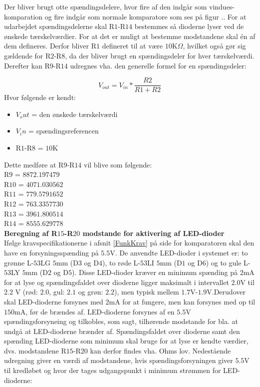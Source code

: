 Der bliver brugt otte spændingsdelere, hvor fire af den indgår som vindues-komparation og fire indgår som normale komparatore som ses på figur .. 
For at udarbejdet spændingsdelerne skal R$1$-R$14$ bestemmes så dioderne lyser ved de ønskede tærskelværdier. For at det er muligt at bestemme modstandene skal én af dem defineres.  Derfor bliver R$1$ defineret til at være $10$K$\Omega$, hvilket også gør sig gældende for R$2$-R$8$, da der bliver brugt en spændingsdeler for hver tærskelværdi. Derefter kan R$9$-R$14$ udregnes vha. den generelle formel for en spændingsdeler:

\begin{equation}
V_{out}=V_{in}*\dfrac{R2}{R1+R2}
\end{equation}
Hvor følgende er kendt:
\begin{itemize}
\item $V_out$ = den ønskede tærskelværdi
\item $V_in$ = spændingsreferencen
\item R$1$-R$8$ = $10$K
\end{itemize}

Dette medføre at R$9$-R$14$ vil blive som følgende:\\
R$9$ = $8872.197479$\\
R$10$ = $4071.030562$ \\
R$11$ = $779.5791652$ \\
R$12$ = $763.3357730$ \\
R$13$ = $3961.800514$ \\
R$14$ = $8555.629778$ \\


\noindent\textbf{Beregning af R$15$-R$20$ modstande for aktivering af LED-dioder} \\
Ifølge kravspecifikationerne i afsnit \ref{FunkKrav}  på side \pageref{FunkKrav} for komparatoren skal den have en forsyningsspænding på  $5.5$V. De anvendte LED-dioder i systemet er: to grønne L-$53$LG $5$mm (D$3$  og D$4$), to røde L-$53$LI $5$mm (D$1$ og D$6$) og to gule L-$53$LY $5$mm (D$2$ og D$5$). Disse LED-dioder kræver en minimum spænding på 2mA for at lyse og spændingsfaldet over dioderne ligger maksimalt i intervallet $2.0$V til $2.2$ V (rød: $2.0$, gul: $2.1$ og grøn: $2.2$), men typisk mellem $1.7$V-$1.9$V.Derudover skal LED-dioderne forsynes med $2$mA for at fungere, men kan forsynes med op til $150$mA, før de brændes af. LED-dioderne forsynes af en $5.5$V spændingsforsyneing og tilkobles, som sagt, tilhørende modstande for bla. at undgå at LED-dioderne brænder af. Spændingsfaldet over dioderne samt den spænding LED-dioderne som minimum skal bruge for at lyse er kendte værdier, dvs. modstandene R$15$-R$20$ kan derfor findes vha. Ohms lov. Nedestående udregning giver en værdi af modstandene, hvis spændingsforsyningen giver $5.5$V til kredløbet og hvor der tages udgangspunkt i  minimum strømmen for LED-dioderne:

